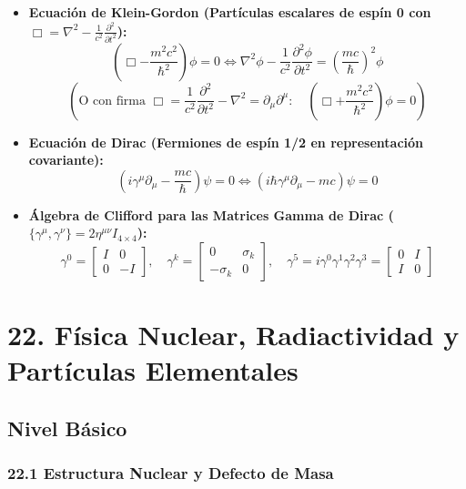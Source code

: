 \documentclass[11pt,a4paper]{article}
\begin{document}
\begin{itemize}
  \item \textbf{Ecuación de Klein-Gordon (Partículas escalares de espín 0 con $\Box = \nabla^2 - \frac{1}{c^2}\frac{\partial^2}{\partial t^2}$):}
  \[
    \left( \Box - \frac{m^2 c^2}{\hbar^2} \right) \phi = 0 \iff \nabla^2\phi - \frac{1}{c^2}\frac{\partial^2\phi}{\partial t^2} = \left(\frac{mc}{\hbar}\right)^2 \phi
  \]
  \[
    \left( \text{O con firma } \Box = \frac{1}{c^2}\frac{\partial^2}{\partial t^2} - \nabla^2 = \partial_\mu \partial^\mu: \quad \left(\Box + \frac{m^2 c^2}{\hbar^2}\right)\phi = 0 \right)
  \]
  \item \textbf{Ecuación de Dirac (Fermiones de espín 1/2 en representación covariante):}
  \[
    (i\gamma^\mu \partial_\mu - \frac{mc}{\hbar})\psi = 0 \iff (i\hbar \gamma^\mu \partial_\mu - mc)\psi = 0
  \]
  \item \textbf{Álgebra de Clifford para las Matrices Gamma de Dirac ($\{\gamma^\mu, \gamma^\nu\} = 2\eta^{\mu\nu} I_{4\times4}$):}
  \[
    \gamma^0 = \begin{bmatrix} I & 0 \\ 0 & -I \end{bmatrix}, \quad \gamma^k = \begin{bmatrix} 0 & \sigma_k \\ -\sigma_k & 0 \end{bmatrix}, \quad \gamma^5 = i\gamma^0 \gamma^1 \gamma^2 \gamma^3 = \begin{bmatrix} 0 & I \\ I & 0 \end{bmatrix}
  \]
\end{itemize}

\section*{22. Física Nuclear, Radiactividad y Partículas Elementales}

\subsection*{Nivel Básico}

\subsubsection*{22.1 Estructura Nuclear y Defecto de Masa}
\end{document}
